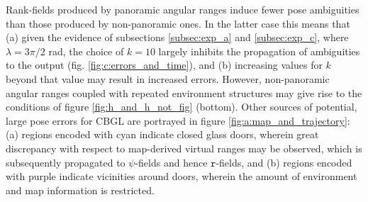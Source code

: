 Rank-fields produced by panoramic angular ranges induce fewer pose ambiguities
than those produced by non-panoramic ones. In the latter case this means that
(a) given the evidence of subsections \ref{subsec:exp_a} and
\ref{subsec:exp_c}, where $\lambda = 3\pi/2$ rad, the choice of $k=10$ largely
inhibits the propagation of ambiguities to the output (fig.
\ref{fig:c:errors_and_time}), and (b) increasing values for $k$ beyond that
value may result in increased errors. However, non-panoramic angular ranges
coupled with repeated environment structures may give rise to the conditions of
figure \ref{fig:h_and_h_not_fig} (bottom). Other sources of potential, large pose errors
for CBGL are portrayed in figure \ref{fig:a:map_and_trajectory}: (a) regions
encoded with cyan indicate closed glass doors, wherein great discrepancy with
respect to map-derived virtual ranges may be observed, which is subsequently
propagated to $\psi$-fields and hence $\texttt{r}$-fields, and (b) regions
encoded with purple indicate vicinities around doors, wherein the amount of
environment and map information is restricted.

